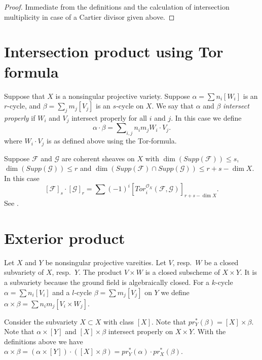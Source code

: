 \begin{proof}
Immediate from the definitions and the calculation of intersection
multiplicity in case of a Cartier divisor given above.
\end{proof}


\section{Intersection product using Tor formula}
\label{section-intersection-product}

\noindent
Suppose that $X$
is a nonsingular projective variety. Suppose
$\alpha = \sum n_i [W_i]$ is an $r$-cycle,
and $\beta = \sum_j m_j [V_j]$ is an $s$-cycle on $X$. We say
that $\alpha$ and $\beta$ {\it intersect properly} if 
$W_i$ and $V_j$ intersect properly for all $i$ and $j$.
In this case we define
$$
\alpha \cdot \beta = \sum\nolimits_{i,j} n_i m_j W_i \cdot V_j.
$$
where $W_i \cdot V_j$ is as defined above using the Tor-formula.

\medskip\noindent
Suppose $\mathcal{F}$ and $\mathcal{G}$ are coherent sheaves on $X$ with
$\dim(Supp(\mathcal{F})) \leq s$, $\dim(Supp(\mathcal{G})) \leq r$
and $\dim( Supp(\mathcal{F}) \cap Supp(\mathcal{G}) ) \leq r+s-\dim X$.
In this case
$$
[\mathcal{F}]_s \cdot [\mathcal{G}]_r = \sum (-1)^i 
[ Tor_i^{\mathcal{O}_X}(\mathcal{F}, \mathcal{G}) ]_{r+s-\dim X}.
$$
See \cite[Chapter V]{Serre_algebre_locale}.


\section{Exterior product}
\label{section-exterior-product}

\noindent
Let $X$ and $Y$ be nonsingular projective vareities.
Let $V$, resp.\ $W$ be a closed subvariety of $X$, resp.\ $Y$.
The product $V\times W$ is a closed subscheme of $X\times Y$.
It is a subvariety because the ground field is algebraically closed.
For a $k$-cycle $\alpha = \sum n_i [V_i]$ and a $l$-cycle
$\beta = \sum m_j [V_j]$ on $Y$ we define
$\alpha \times \beta = \sum n_i m_j [V_i \times W_j]$. 

\medskip\noindent
Consider the subvariety $X \subset X$ with class $[X]$.
Note that $pr_Y^*(\beta) = [X]\times \beta$.
Note that $\alpha \times [Y]$ and $[X]\times \beta$
intersect properly on $X\times Y$. With the definitions
above we have $\alpha \times \beta = 
(\alpha \times [Y])\cdot ([X]\times\beta) =
pr_Y^*(\alpha) \cdot pr_X^*(\beta)$.


